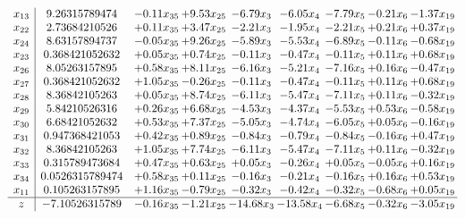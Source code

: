 \documentclass[8pt]{article}
\begin{document}
\[\begin{array}{c| c c@{\hskip 2pt} c@{\hskip 2pt} c@{\hskip 2pt} c@{\hskip 2pt} c@{\hskip 2pt} c@{\hskip 2pt} c@{\hskip 2pt} }
 x_{13}   &  9.26315789474 & -0.11 x_{35} & +  9.53 x_{25} & -6.79 x_{3} & -6.05 x_{4} & -7.79 x_{5} & -0.21 x_{6} & -1.37 x_{19}\\
 x_{22}   &  2.73684210526 & +  0.11 x_{35} & +  3.47 x_{25} & -2.21 x_{3} & -1.95 x_{4} & -2.21 x_{5} & +  0.21 x_{6} & +  0.37 x_{19}\\
 x_{24}   &  8.63157894737 & -0.05 x_{35} & +  9.26 x_{25} & -5.89 x_{3} & -5.53 x_{4} & -6.89 x_{5} & -0.11 x_{6} & -0.68 x_{19}\\
 x_{23}   &  0.368421052632 & +  0.05 x_{35} & +  0.74 x_{25} & -0.11 x_{3} & -0.47 x_{4} & -0.11 x_{5} & +  0.11 x_{6} & +  0.68 x_{19}\\
 x_{26}   &  8.05263157895 & +  0.58 x_{35} & +  8.11 x_{25} & -6.16 x_{3} & -5.21 x_{4} & -7.16 x_{5} & +  0.16 x_{6} & -0.47 x_{19}\\
 x_{27}   &  0.368421052632 & +  1.05 x_{35} & -0.26 x_{25} & -0.11 x_{3} & -0.47 x_{4} & -0.11 x_{5} & +  0.11 x_{6} & +  0.68 x_{19}\\
 x_{28}   &  8.36842105263 & +  0.05 x_{35} & +  8.74 x_{25} & -6.11 x_{3} & -5.47 x_{4} & -7.11 x_{5} & +  0.11 x_{6} & -0.32 x_{19}\\
 x_{29}   &  5.84210526316 & +  0.26 x_{35} & +  6.68 x_{25} & -4.53 x_{3} & -4.37 x_{4} & -5.53 x_{5} & +  0.53 x_{6} & -0.58 x_{19}\\
 x_{30}   &  6.68421052632 & +  0.53 x_{35} & +  7.37 x_{25} & -5.05 x_{3} & -4.74 x_{4} & -6.05 x_{5} & +  0.05 x_{6} & -0.16 x_{19}\\
 x_{31}   &  0.947368421053 & +  0.42 x_{35} & +  0.89 x_{25} & -0.84 x_{3} & -0.79 x_{4} & -0.84 x_{5} & -0.16 x_{6} & +  0.47 x_{19}\\
 x_{32}   &  8.36842105263 & +  1.05 x_{35} & +  7.74 x_{25} & -6.11 x_{3} & -5.47 x_{4} & -7.11 x_{5} & +  0.11 x_{6} & -0.32 x_{19}\\
 x_{33}   &  0.315789473684 & +  0.47 x_{35} & +  0.63 x_{25} & +  0.05 x_{3} & -0.26 x_{4} & +  0.05 x_{5} & -0.05 x_{6} & +  0.16 x_{19}\\
 x_{34}   &  0.0526315789474 & +  0.58 x_{35} & +  0.11 x_{25} & -0.16 x_{3} & -0.21 x_{4} & -0.16 x_{5} & +  0.16 x_{6} & +  0.53 x_{19}\\
 x_{11}   &  0.105263157895 & +  1.16 x_{35} & -0.79 x_{25} & -0.32 x_{3} & -0.42 x_{4} & -0.32 x_{5} & -0.68 x_{6} & +  0.05 x_{19}\\
\hline
z    &  -7.10526315789 & -0.16 x_{35} & -1.21 x_{25} & -14.68 x_{3} & -13.58 x_{4} & -6.68 x_{5} & -0.32 x_{6} & -3.05 x_{19}\\
\end{array}\]
\end{document}
